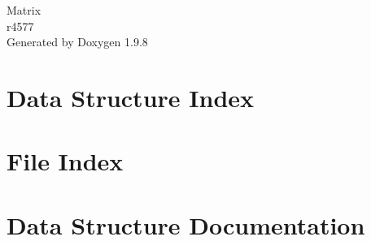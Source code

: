 \documentclass[twoside]{book}
\newcommand{\+}{\discretionary{\mbox{\scriptsize$\hookleftarrow$}}{}{}}
\newcommand{\clearemptydoublepage}{%
    \newpage{\pagestyle{empty}\cleardoublepage}%
  }
\begin{document}
  \raggedbottom
    \hypersetup{pageanchor=false,
                bookmarksnumbered=true,
                pdfencoding=unicode
               }
  \begin{titlepage}
  \vspace*{7cm}
  \begin{center}%
  {\Large Matrix}\\
  [1ex]\large r4577 \\
  \vspace*{1cm}
  {\large Generated by Doxygen 1.9.8}\\
  \end{center}
  \end{titlepage}
  \clearemptydoublepage
  \tableofcontents
  \clearemptydoublepage
  \hypersetup{pageanchor=true}
\chapter{Data Structure Index}

\chapter{File Index}

\chapter{Data Structure Documentation}




\end{document}
